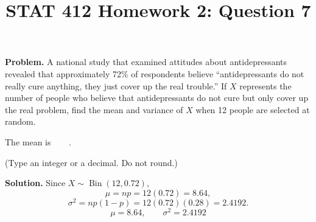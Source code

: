 \documentclass[11pt]{article}
\title{STAT 412 Homework 2: Question 7}
\author{}
\date{}
\begin{document}
\maketitle
\textbf{Problem.} A national study that examined attitudes about
antidepressants revealed that approximately 72\% of respondents believe
``antidepressants do not really cure anything, they just cover up the real
trouble.'' If \(X\) represents the number of people who believe that
antidepressants do not cure but only cover up the real problem, find the mean
and variance of \(X\) when 12 people are selected at random.

The mean is \(\boxed{\phantom{0.00}}\).

(Type an integer or a decimal. Do not round.)

\textbf{Solution.} Since \(X\sim\operatorname{Bin}(12,0.72)\),
\[
\mu=np=12(0.72)=8.64,
\]
\[
\sigma^2=np(1-p)=12(0.72)(0.28)=2.4192.
\]
\[
\boxed{\mu=8.64,\qquad \sigma^2=2.4192}
\]
\end{document}
